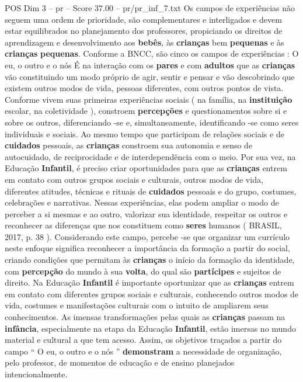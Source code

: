 \begin{textsample}{POS Dim 3 – pr – Score 37.00 – pr/pr\_inf\_7.txt}
Os campos de experiências não seguem uma ordem de prioridade, são complementares e interligados e devem estar equilibrados no planejamento dos professores, propiciando os direitos de aprendizagem e desenvolvimento aos \textbf{bebês}, às \textbf{crianças} bem \textbf{pequenas} e às \textbf{crianças} \textbf{pequenas}.
Conforme a BNCC, são cinco os campos de experiências : O eu, o outro e o nós É na interação com os \textbf{pares} e com \textbf{adultos} que as \textbf{crianças} vão constituindo um modo próprio de agir, sentir e pensar e vão descobrindo que existem outros modos de vida, pessoas diferentes, com outros pontos de vista.
Conforme vivem suas primeiras experiências sociais ( na família, na \textbf{instituição} escolar, na coletividade ), constroem \textbf{percepções} e questionamentos sobre si e sobre os outros, diferenciando -se e, simultaneamente, identificando -se como seres individuais e sociais.
Ao mesmo tempo que participam de relações sociais e de \textbf{cuidados} pessoais, as \textbf{crianças} constroem sua autonomia e senso de autocuidado, de reciprocidade e de interdependência com o meio.
Por sua vez, na Educação \textbf{Infantil}, é preciso criar oportunidades para que as \textbf{crianças} entrem em contato com outros grupos sociais e culturais, outros modos de vida, diferentes atitudes, técnicas e rituais de \textbf{cuidados} pessoais e do grupo, costumes, celebrações e narrativas.
Nessas experiências, elas podem ampliar o modo de perceber a si mesmas e ao outro, valorizar sua identidade, respeitar os outros e reconhecer as diferenças que nos constituem como \textbf{seres} humanos ( BRASIL, 2017, p. 38 ).
Considerando este campo, percebe -se que organizar um currículo neste enfoque significa reconhecer a importância da formação a partir do social, criando condições que permitam às \textbf{crianças} o início da formação da identidade, com \textbf{percepção} do mundo à sua \textbf{volta}, do qual são \textbf{partícipes} e sujeitos de direito.
Na Educação \textbf{Infantil} é importante oportunizar que as \textbf{crianças} entrem em contato com diferentes grupos sociais e culturais, conhecendo outros modos de vida, costumes e manifestações culturais com o intuito de ampliarem seus conhecimentos.
As imensas transformações pelas quais as \textbf{crianças} passam na \textbf{infância}, especialmente na etapa da Educação \textbf{Infantil}, estão imersas no mundo material e cultural a que tem acesso.
Assim, os objetivos traçados a partir do campo “ O eu, o outro e o nós ” \textbf{demonstram} a necessidade de organização, pelo professor, de momentos de educação e de ensino planejados intencionalmente.

\end{textsample}
